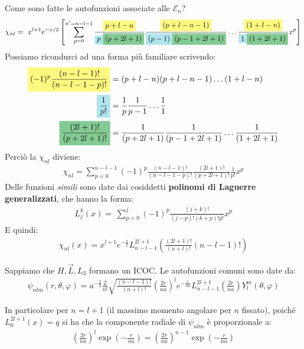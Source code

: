 \documentclass[../../FisicaTeorica.tex]{subfiles}
\begin{document}
Come sono fatte le autofunzioni associate alle $\mathcal{E}_n$?
\begin{align*}
\chi_{nl} =\ x^{l+1} e^{-x/2} \left[
\sum_{p=0}^{n' = n - l -1} \frac{\hlc{Yellow}{p+l-n}}{\hlc{SkyBlue}{p}\hlc{ForestGreen}{(p+2l+1)}}
\frac{\hlc{Yellow}{(p+l-n-1)}}{\hlc{SkyBlue}{(p-1)}\hlc{ForestGreen}{(p-1+2l+1)}}\dots\frac{\hlc{Yellow}{(1+l-n)}}{\hlc{SkyBlue}{1}\hlc{ForestGreen}{(1+2l+1)}} x^p
\right]
\end{align*}
Possiamo ricondurci ad una forma più familiare scrivendo:
\begin{align*}
\hlc{Yellow}{(-1)^p \frac{(n-l-1)!}{(n-l-1-p)!}} &=
(p+l-n)(p+l-n-1)\dots(1+l-n)\\
\hlc{SkyBlue}{\frac{1}{p!}} &= \frac{1}{p}\frac{1}{p-1}\dots \frac{1}{1}\\
\hlc{ForestGreen}{\frac{(2l+1)!}{(p+2l+1)!}} &=\frac{1}{(p+2l+1)}\frac{1}{(p-1+2l+1)}\dots\frac{1}{(1+2l+1)}
\end{align*}
Perciò la $\chi_{nl}$ diviene:
\begin{align*}
\chi_{nl} = \sum_{p=0}^{n-l-1} (-1)^p \frac{(n-l-1)!}{(n-l-1-p)!}\frac{(2l+1)!}{(p+2l+1)!}\frac{1}{p!} x^p
\end{align*}
Delle funzioni \textit{simili} sono date dai cosiddetti \textbf{polinomi di Laguerre generalizzati}, che hanno la forma:
\begin{align*}
L_j^k (x) =\ \sum_{p=0}^j (-1)^p \frac{(j+k)!}{(j-p)!(k+p)!p!}x^p
\end{align*}
E quindi:
\begin{align*}
\chi_{nl}(x) = x^{l+1}e^{-\frac{x}{2}}L^{2l+1}_{n-l-1}\left(\frac{(2l+1)!}{(n+l)!}(n-l-1)!\right)
\end{align*}

Sappiamo che $H, \vec{L}, L_3$ formano un ICOC. Le autofunzioni comuni sono date da:
\begin{align*}
\psi_{nlm} (r,\theta,\varphi) = a^{-\frac{3}{2}} \frac{2}{n!} \sqrt{\frac{(n-l-1)!}{(n+l)!}}\left(\frac{2r}{na}\right)^l e^{-\frac{r}{na}} L^{2l+1}_{n-l-1}\left(\frac{2r}{na}\right)Y^m_l(\theta,\varphi)
\end{align*}

In particolare per $n=l+1$ (il massimo momento angolare per $n$ fissato), poiché $L_0^{2l+1}(x)=q$ si ha che la componente radiale di $\psi_{nlm}$ è proporzionale a:
\begin{align*}
\left(\frac{2r}{na}\right)^l \exp\left({-\frac{r}{na}}\right) = \left(\frac{2r}{na}\right)^{n-1} \exp\left(-\frac{r}{na}\right)
\end{align*}
\end{document}
